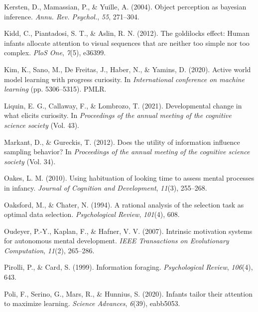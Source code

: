 \documentclass[10pt, letterpaper]{article}
\newenvironment{CSLReferences}%
  {}%
  {\par}
\begin{document}
\begin{CSLReferences}{1}{0}
\leavevmode{}%
Kersten, D., Mamassian, P., \& Yuille, A. (2004). Object perception as
bayesian inference. \emph{Annu. Rev. Psychol.}, \emph{55}, 271--304.

\leavevmode{}%
Kidd, C., Piantadosi, S. T., \& Aslin, R. N. (2012). The goldilocks
effect: Human infants allocate attention to visual sequences that are
neither too simple nor too complex. \emph{PloS One}, \emph{7}(5),
e36399.

\leavevmode{}%
Kim, K., Sano, M., De Freitas, J., Haber, N., \& Yamins, D. (2020).
Active world model learning with progress curiosity. In
\emph{International conference on machine learning} (pp. 5306--5315).
PMLR.

\leavevmode{}%
Liquin, E. G., Callaway, F., \& Lombrozo, T. (2021). Developmental
change in what elicits curiosity. In \emph{Proceedings of the annual
meeting of the cognitive science society} (Vol. 43).

\leavevmode{}%
Markant, D., \& Gureckis, T. (2012). Does the utility of information
influence sampling behavior? In \emph{Proceedings of the annual meeting
of the cognitive science society} (Vol. 34).

\leavevmode{}%
Oakes, L. M. (2010). Using habituation of looking time to assess mental
processes in infancy. \emph{Journal of Cognition and Development},
\emph{11}(3), 255--268.

\leavevmode{}%
Oaksford, M., \& Chater, N. (1994). A rational analysis of the selection
task as optimal data selection. \emph{Psychological Review},
\emph{101}(4), 608.

\leavevmode{}%
Oudeyer, P.-Y., Kaplan, F., \& Hafner, V. V. (2007). Intrinsic
motivation systems for autonomous mental development. \emph{IEEE
Transactions on Evolutionary Computation}, \emph{11}(2), 265--286.

\leavevmode{}%
Pirolli, P., \& Card, S. (1999). Information foraging.
\emph{Psychological Review}, \emph{106}(4), 643.

\leavevmode{}%
Poli, F., Serino, G., Mars, R., \& Hunnius, S. (2020). Infants tailor
their attention to maximize learning. \emph{Science Advances},
\emph{6}(39), eabb5053.


\end{CSLReferences}
\end{document}
